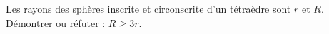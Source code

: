 Les rayons des sphères inscrite et circonscrite d'un tétraèdre sont $r$ et $R$. Démontrer ou réfuter : $R \geq 3r$.
